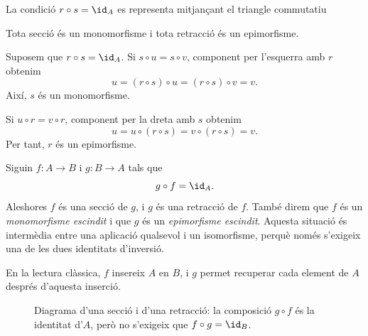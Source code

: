 \begin{notacio}\label{not:seccio-retraccio}
La condició \(r\circ s=\id_A\) es representa mitjançant el triangle commutatiu
\begin{center}
\end{center}
\end{notacio}

\begin{proposicio}\label{prop:seccio-mono-retraccio-epi}
Tota secció és un monomorfisme i tota retracció és un epimorfisme.
\end{proposicio}

\begin{prova}
Suposem que \(r\circ s=\id_A\). Si \(s\circ u=s\circ v\), component per l'esquerra amb \(r\) obtenim
\[
u=(r\circ s)\circ u=(r\circ s)\circ v=v.
\]
Així, \(s\) és un monomorfisme.

Si \(u\circ r=v\circ r\), component per la dreta amb \(s\) obtenim
\[
u=u\circ(r\circ s)=v\circ(r\circ s)=v.
\]
Per tant, \(r\) és un epimorfisme.
\end{prova}

\begin{observacio}\label{obs:escindits}
Siguin \(f:A\to B\) i \(g:B\to A\) tals que
\[
g\circ f=\id_A.
\]
Aleshores \(f\) és una secció de \(g\), i \(g\) és una retracció de \(f\). També direm que \(f\) és un \emph{monomorfisme escindit} i que \(g\) és un \emph{epimorfisme escindit}. Aquesta situació és intermèdia entre una aplicació qualsevol i un isomorfisme, perquè només s'exigeix una de les dues identitats d'inversió.

En la lectura clàssica, \(f\) insereix \(A\) en \(B\), i \(g\) permet recuperar cada element de \(A\) després d'aquesta inserció.

\begin{figure}[H]
  \centering
  \caption{Diagrama d'una secció i d'una retracció: la composició $g\circ f$ és la identitat d'$A$, però no s'exigeix que $f\circ g=\id_B$.}
  \label{fig:seccio-retraccio}
\end{figure}

\end{observacio}

